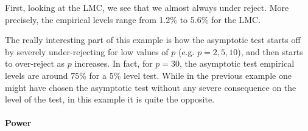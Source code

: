 \documentclass[11pt]{article}\usepackage[]{graphicx}\usepackage[]{color}
\begin{document}
\begin{table}[H]
	\centering
	\caption{Empirical levels for 1000 replications of the Wald statistic where $\alpha = 5\%$, $\theta_1=0$ and $\theta_2=...=\theta_p=0$,  testing $H_0: \theta_1^2 + ...  +\theta_p^2 =0$ against $H_1: \theta_1^2 + ...  +\theta_p^2  \neq 0$}
	\label{tbl:W:5}
\end{table}


First, looking at the LMC, we see that we almost always under reject. More precisely, the empirical levels range from 1.2\% to 5.6\% for the LMC.

The really interesting part of this example is how the asymptotic test starts off by severely under-rejecting for low values of $p$ (e.g. $p=2,5,10$), and then starts to over-reject as $p$ increases. In fact, for $p=30$, the asymptotic test empirical levels are around 75\% for a 5\% level test. While in the previous example one might have chosen the asymptotic test without any severe consequence on the level of the test, in this example it is quite the opposite.

\paragraph{Power}
\end{document}
